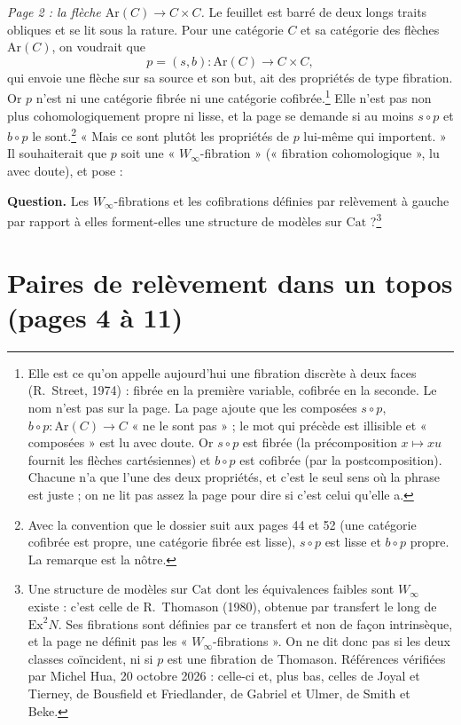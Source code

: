 \documentclass[11pt,a4paper]{article}
\begin{document}
\emph{Page 2 : la flèche $\mathrm{Ar}(C) \to C \times C$.} Le feuillet est barré
de deux longs traits obliques et se lit sous la rature. Pour une catégorie $C$
et sa catégorie des flèches $\mathrm{Ar}(C)$, on voudrait que
\[
p = (s, b) : \mathrm{Ar}(C) \longrightarrow C \times C,
\]
qui envoie une flèche sur sa source et son but, ait des propriétés de type
fibration. Or $p$ n'est ni une catégorie fibrée ni une catégorie
cofibrée.\footnote{Elle est ce qu'on appelle aujourd'hui une fibration
discrète à deux faces (R.~Street, 1974) : fibrée en la première variable,
cofibrée en la seconde. Le nom n'est pas sur la page. La page ajoute que les
composées $s \circ p$, $b \circ p : \mathrm{Ar}(C) \to C$ « ne le sont pas » ;
le mot qui précède est illisible et « composées » est lu avec doute. Or
$s \circ p$ est fibrée (la précomposition $x \mapsto x u$ fournit les
flèches cartésiennes) et $b \circ p$ est cofibrée (par la postcomposition).
Chacune n'a que l'une des deux propriétés, et c'est le seul sens où la phrase
est juste ; on ne lit pas assez la page pour dire si c'est celui qu'elle a.}
Elle n'est pas non plus cohomologiquement propre ni lisse, et la page se
demande si au moins $s \circ p$ et $b \circ p$ le sont.\footnote{Avec la
convention que le dossier suit aux pages 44 et 52 (une catégorie cofibrée est
propre, une catégorie fibrée est lisse), $s \circ p$ est lisse et $b \circ p$
propre. La remarque est la nôtre.} « Mais ce sont plutôt les propriétés de
$p$ lui-même qui importent. » Il souhaiterait que $p$ soit une
« $W_\infty$-fibration » (« fibration cohomologique », lu avec doute), et
pose :

\textbf{Question.} Les $W_\infty$-fibrations et les cofibrations définies par
relèvement à gauche par rapport à elles forment-elles une structure de
modèles sur $\mathrm{Cat}$ ?\footnote{Une structure de modèles sur
$\mathrm{Cat}$ dont les équivalences faibles sont $W_\infty$ existe : c'est
celle de R.~Thomason (1980), obtenue par transfert le long de
$\mathrm{Ex}^2 N$. Ses fibrations sont définies par ce transfert et non de
façon intrinsèque, et la page ne définit pas les « $W_\infty$-fibrations ».
On ne dit donc pas si les deux classes coïncident, ni si $p$ est une
fibration de Thomason.
Références vérifiées par Michel Hua, 20 octobre 2026 : celle-ci et, plus bas,
celles de Joyal et Tierney, de Bousfield et Friedlander,
de Gabriel et Ulmer, de Smith et Beke.}

\section*{Paires de relèvement dans un topos (pages 4 à 11)}
\end{document}
